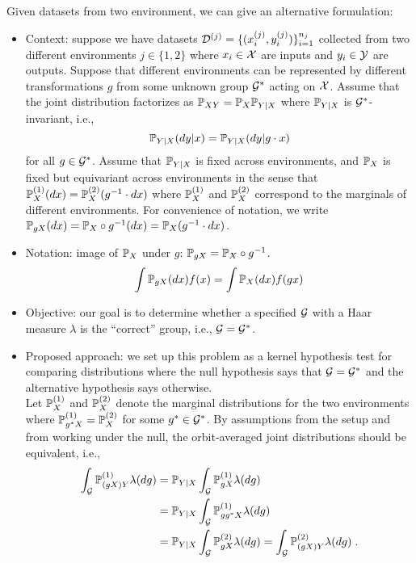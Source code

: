 Given datasets from two environment, we can give an alternative formulation:

\begin{itemize}

\item
Context: suppose we have datasets $\calD^{(j)}=\{(x_i^{(j)},y_i^{(j)})\}_{i=1}^{n_j}$ collected from two different environments $j\in\{1,2\}$ where $x_i\in\calX$ are inputs and $y_i\in\calY$ are outputs. Suppose that different environments can be represented by different transformations $g$ from some unknown group $\calG^*$ acting on $\calX$. Assume that the joint distribution factorizes as $\bbP_{XY}=\bbP_X\bbP_{Y|X}$ where $\bbP_{Y|X}$ is $\calG^*$-invariant, i.e.,
\[
\bbP_{Y|X}(dy|x) = \bbP_{Y|X}(dy|g\cdot x)
\]
for all $g\in\calG^*$. Assume that $\bbP_{Y|X}$ is fixed across environments, and $\bbP_X$ is fixed but equivariant across environments in the sense that $\bbP_X^{(1)}(dx)=\bbP_X^{(2)}(g^{-1}\cdot dx)$ where $\bbP_X^{(1)}$ and $\bbP_X^{(2)}$ correspond to the marginals of different environments. For convenience of notation, we write $\bbP_{gX}(dx)=\P_X\circ g^{-1}(dx) = \bbP_X(g^{-1}\cdot dx)$.

\item
Notation: image of $\P_X$ under $g$: $\P_{gX} = \P_{X} \circ g^{-1}$.
\[
\int \P_{gX}(dx) f(x) = \int \P_X(dx) f(gx)
\]

\item
Objective: our goal is to determine whether a specified $\calG$ with a Haar measure $\lambda$ is the ``correct'' group, i.e., $\calG=\calG^*$.

\item
Proposed approach: we set up this problem as a kernel hypothesis test for comparing distributions where the null hypothesis says that $\calG=\calG^*$ and the alternative hypothesis says otherwise.
\\

Let $\bbP_X^{(1)}$ and $\bbP_X^{(2)}$ denote the marginal distributions for the two environments where $\bbP_{g^*X}^{(1)}=\bbP_X^{(2)}$ for some $g^*\in\calG^*$. By assumptions from the setup and from working under the null, the orbit-averaged joint distributions should be equivalent, i.e.,
\begin{align*}
\int_{\calG}\bbP_{(gX)Y}^{(1)}\lambda(dg) &=
\bbP_{Y|X}\int_{\calG}\bbP_{gX}^{(1)}\lambda(dg) \\
&= \bbP_{Y|X}\int_{\calG}\bbP_{gg^*X}^{(1)}\lambda(dg) \\
&= \bbP_{Y|X}\int_{\calG}\bbP_{gX}^{(2)}\lambda(dg) = \int_{\calG}\bbP_{(gX)Y}^{(2)}\lambda(dg) \;.
\end{align*}


\end{itemize}
